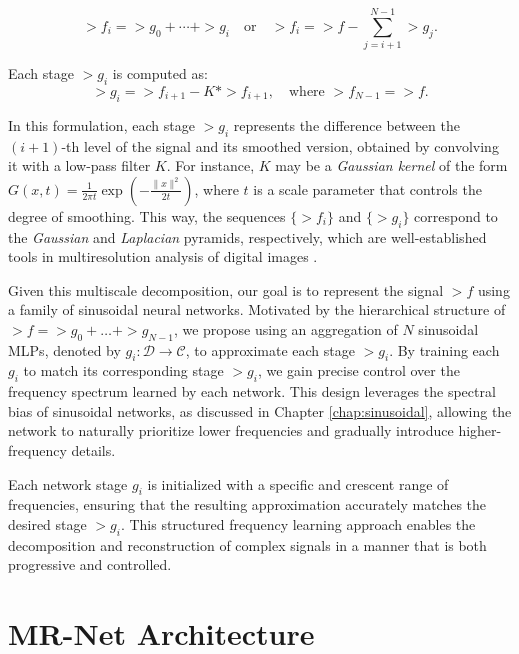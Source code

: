 \begin{equation}
\gt{f}_i = \gt{g}_0 + \cdots + \gt{g}_i \quad \text{or} \quad \gt{f}_i = \gt{f} - \sum_{j=i+1}^{N-1} \gt{g}_j.
\end{equation}

Each stage $\gt{g}_i$ is computed as:
\begin{equation}
\gt{g}_i = \gt{f}_{i+1} - K * \gt{f}_{i+1}, \quad \text{where } \gt{f}_{N-1} = \gt{f}.
\end{equation}

In this formulation, each stage $\gt{g}_i$ represents the difference between the $(i+1)$-th level of the signal and its smoothed version, obtained by convolving it with a low-pass filter $K$. For instance, $K$ may be a \textit{Gaussian kernel} of the form $G(x,t)=\frac{1}{2\pi t}\exp{\left(-\frac{\|x\|^2}{2t}\right)}$, where $t$ is a scale parameter that controls the degree of smoothing. This way, the sequences $\{\gt{f}_i\}$ and $\{\gt{g}_i\}$ correspond to the \textit{Gaussian} and \textit{Laplacian} pyramids, respectively, which are well-established tools in multiresolution analysis of digital images \citep{lindeberg1994scale, velho2009image, rosenfeld2013multiresolution}.

Given this multiscale decomposition, our goal is to represent the signal $\gt{f}$ using a family of sinusoidal neural networks. Motivated by the hierarchical structure of $\gt{f}=\gt{g}_0+\dots+\gt{g}_{N-1}$, we propose using an aggregation of $N$ sinusoidal MLPs, denoted by $g_i:\mathcal{D}\to \mathcal{C}$, to approximate each stage $\gt{g}_i$. By training each $g_i$ to match its corresponding stage $\gt{g}_i$, we gain precise control over the frequency spectrum learned by each network. This design leverages the spectral bias of sinusoidal networks, as discussed in Chapter \ref{chap:sinusoidal}, allowing the network to naturally prioritize lower frequencies and gradually introduce higher-frequency details.

Each network stage $g_i$ is initialized with a specific and crescent range of frequencies, ensuring that the resulting approximation accurately matches the desired stage $\gt{g}_i$. This structured frequency learning approach enables the decomposition and reconstruction of complex signals in a manner that is both progressive and controlled.

\section{MR-Net Architecture}

